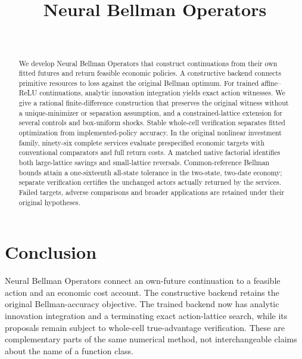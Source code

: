 \documentclass[ecta,nameyear,draft]{econsocart}
\begin{document}
\begin{frontmatter}
\title{Neural Bellman Operators}
\begin{aug}
\author[id=au1,addressref={add1}]{~}
\address[id=add1]{Peking University}
\end{aug}
\begin{abstract}
We develop Neural Bellman Operators that construct continuations from their own fitted futures and return feasible economic policies. A constructive backend connects primitive resources to loss against the original Bellman optimum. For trained affine--ReLU continuations, analytic innovation integration yields exact action witnesses. We give a rational finite-difference construction that preserves the original witness without a unique-minimizer or separation assumption, and a constrained-lattice extension for several controls and box-uniform shocks. Stable whole-cell verification separates fitted optimization from implemented-policy accuracy. In the original nonlinear investment family, ninety-six complete services evaluate prespecified economic targets with conventional comparators and full return costs. A matched native factorial identifies both large-lattice savings and small-lattice reversals. Common-reference Bellman bounds attain a one-sixteenth all-state tolerance in the two-state, two-date economy; separate verification certifies the unchanged actors actually returned by the services. Failed targets, adverse comparisons and broader applications are retained under their original hypotheses.
\end{abstract}
\begin{keyword}
\end{keyword}
\end{frontmatter}



















\section{Conclusion}\label{sec:conclusion56}
Neural Bellman Operators connect an own-future continuation to a feasible action and an economic cost account. The constructive backend retains the original Bellman-accuracy objective. The trained backend now has analytic innovation integration and a terminating exact action-lattice search, while its proposals remain subject to whole-cell true-advantage verification. These are complementary parts of the same numerical method, not interchangeable claims about the name of a function class.
\end{document}
